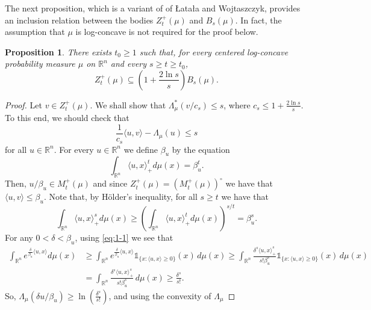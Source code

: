 \documentclass[11pt,leqno]{article}
\newtheorem{proposition}[theorem]{Proposition}
\theoremstyle{definition}
\theoremstyle{remark}
\numberwithin{equation}{section}
\newcommand{\ls}{\leqslant}
\newcommand{\gr}{\geqslant}
\newcommand{\1}{\textbf{1}}
\begin{document}
The next proposition, which is a variant of \cite[Proposition~3.2]{Latala-Wojtaszczyk-2008} of \L ata\l a and Wojtaszczyk,
provides an inclusion relation between the bodies $Z_t^+(\mu)$ and $B_s(\mu)$. In fact, the assumption that $\mu$ is log-concave
is not required for the proof below.

\begin{proposition}\label{prop:1}There exists $t_0\gr 1$ such that, for every centered log-concave probability measure $\mu $ on ${\mathbb R}^n$ and 
every $s\gr t\gr t_0$,
\begin{equation*}Z_t^+(\mu) \subseteq \left(1+\frac{2\ln s}{s}\right)B_s(\mu).\end{equation*}
\end{proposition}

\begin{proof}Let $v\in Z_t^+(\mu)$. We shall show that $\Lambda^{\ast }_{\mu }(v/c_s)\ls s$, where
$c_s\ls 1+\frac{2\ln s}{s}$. To this end, we should check that
\begin{equation*}\frac{1}{c_s}\langle u, v\rangle-\Lambda_\mu(u) \ls s\end{equation*}
for all $u\in{\mathbb R}^n$. For every $u\in{\mathbb R}^n$ we define $\beta_u$ by the equation
\begin{equation*}\int_{{\mathbb R}^n}\langle u, x\rangle_+^td\mu(x) = \beta_u^t.\end{equation*}
Then, $u/\beta_u\in M^+_t(\mu)$ and since $Z_t^+(\mu )=(M_t^+(\mu ))^{\circ }$
we have that $\langle u,v\rangle \ls \beta_u$. Note that, by H\"{o}lder's inequality, for all $s\gr t$ we have that
\begin{equation}\label{eq:1-1}\int_{{\mathbb R}^n}\langle u, x\rangle_+^sd\mu(x)\gr \left(\int_{{\mathbb R}^n}\langle u, x\rangle_+^td\mu(x)\right)^{s/t}=\beta_u^s.\end{equation}
For any $0<\delta<\beta_u$, using \eqref{eq:1-1} we see that
\begin{align*}\int_{{\mathbb R}^n} e^{\frac{\delta}{\beta_u}\langle u,x\rangle }d\mu(x) &\gr  \int_{{\mathbb R}^n} e^{\frac{\delta}{\beta_u}\langle
u,x\rangle}\mathds{1}_{\{x:\langle u,x\rangle \gr 0\}}(x)\,d\mu(x)
\gr \int_{{\mathbb R}^n} \frac{\delta^s\langle u, x\rangle_+^s}{s!\beta_u^s} \mathds{1}_{\{x:\langle
u,x\rangle \gr 0\}}(x)\,d\mu(x) \\
&=\int_{{\mathbb R}^n} \frac{\delta^s\langle u, x\rangle_+^s}{s!\beta_u^s}\,d\mu(x)
\gr\frac{\delta^s}{s!}.\end{align*}
So, $\Lambda_{\mu}(\delta u/\beta_u)\gr \ln\left(\frac{\delta^s}{s!}\right)$, and using the convexity of $\Lambda_{\mu}$

\end{proof}
\end{document}

